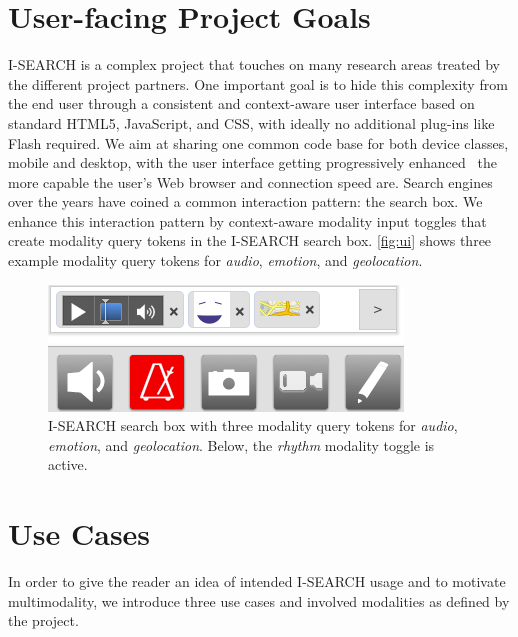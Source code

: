 \documentclass{acm_proc_article-sp}
\let\oldemph\emph
\renewcommand{\emph}[1]{\oldemph{\fontsize{9}{9}\selectfont #1}}
\begin{document}
\section{User-facing Project Goals} \label{sec:projectgoals}
\mbox{I-SEARCH} is a complex project that touches on many research areas treated by the different project partners.
One important goal is to hide this complexity from the end user through a consistent and context-aware user interface based on standard HTML5, JavaScript, and CSS, with ideally no additional plug-ins like Flash required.
We aim at sharing one common code base for both device classes, mobile and desktop, with the user interface getting progressively enhanced~\cite{progressiveenhancement} the more capable the user's Web browser and connection speed are.
Search engines over the years have coined a common interaction pattern: the search box.
We enhance this interaction pattern by context-aware modality input toggles that create modality query tokens in the \mbox{I-SEARCH} search box.
\autoref{fig:ui} shows three example modality query tokens for \emph{audio}, \emph{emotion}, and \emph{geolocation}.

\begin{figure}
\includegraphics[width=\columnwidth]{./resources/ui.png}
\caption{\mbox{I-SEARCH} search box with three modality query tokens for \emph{audio}, \emph{emotion}, and \emph{geolocation}. Below, the \emph{rhythm} modality toggle is active.}
\label{fig:ui}
\vspace{-1em}
\end{figure}

\section{Use Cases} \label{sec:usecases}
In order to give the reader an idea of intended \mbox{I-SEARCH} usage and to motivate multimodality, we introduce three use cases and involved modalities as defined by the project.
\vspace{-1.5em}
\end{document}

